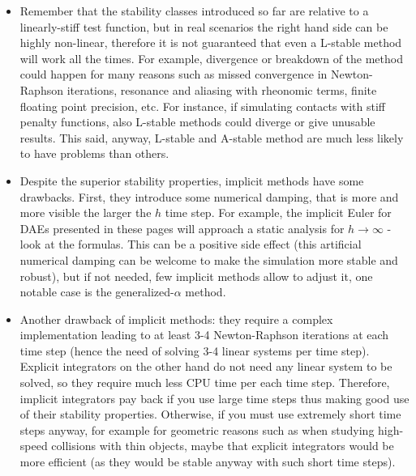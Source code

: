 \documentclass{digitaldynamics}
\begin{document}
\begin{itemize}
	\item
	Remember that the stability classes introduced so far are relative to a linearly-stiff test function, but in real scenarios the right hand side can be highly non-linear, therefore it is not guaranteed that even a L-stable method will work all the times. For example, divergence or breakdown of the method could happen for many reasons such as missed convergence in Newton-Raphson iterations, resonance and aliasing with rheonomic terms, finite floating point precision, etc. For instance, if simulating contacts with stiff penalty functions, also L-stable methods could diverge or give unusable results. 
	This said, anyway, L-stable and A-stable method are much less likely to have problems than others.
	
	\item
	Despite the superior stability properties, implicit methods have some drawbacks. First, they introduce some numerical damping, that is more and more visible the larger the $h$ time step. For example, the implicit Euler for DAEs presented in these pages will approach a static analysis for $h\rightarrow \infty$ - look at the formulas. This can be a positive side effect (this artificial numerical damping can be welcome to make the simulation more stable and robust), but if not needed, few implicit methods allow to adjust it, one notable case is the generalized-$\alpha$ method.
	
	\item 
	Another drawback of implicit methods: they require a complex implementation leading to at least 3-4 Newton-Raphson iterations at each time step (hence the need of solving 3-4 linear systems per time step). Explicit integrators on the other hand do not need any linear system to be solved, so they require much less CPU time per each time step. Therefore, implicit integrators pay back if you use large time steps thus making good use of their stability properties. Otherwise, if you must use extremely short time steps anyway, for example for geometric reasons such as when studying high-speed collisions with thin objects, maybe that explicit integrators would be more efficient (as they would be stable anyway with such short time steps).
	
\end{itemize}





%

\end{document}
